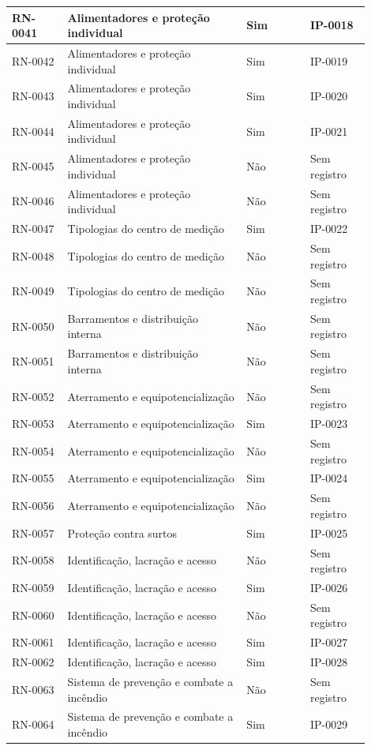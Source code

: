 \begin{longtable}{|p{0.14\linewidth}|p{0.45\linewidth}|p{0.16\linewidth}|p{0.15\linewidth}|}
RN-0041 & Alimentadores e proteção individual & Sim & IP-0018 \\\hline
RN-0042 & Alimentadores e proteção individual & Sim & IP-0019 \\\hline
RN-0043 & Alimentadores e proteção individual & Sim & IP-0020 \\\hline
RN-0044 & Alimentadores e proteção individual & Sim & IP-0021 \\\hline
RN-0045 & Alimentadores e proteção individual & Não & Sem registro \\\hline
RN-0046 & Alimentadores e proteção individual & Não & Sem registro \\\hline
RN-0047 & Tipologias do centro de medição & Sim & IP-0022 \\\hline
RN-0048 & Tipologias do centro de medição & Não & Sem registro \\\hline
RN-0049 & Tipologias do centro de medição & Não & Sem registro \\\hline
RN-0050 & Barramentos e distribuição interna & Não & Sem registro \\\hline
RN-0051 & Barramentos e distribuição interna & Não & Sem registro \\\hline
RN-0052 & Aterramento e equipotencialização & Não & Sem registro \\\hline
RN-0053 & Aterramento e equipotencialização & Sim & IP-0023 \\\hline
RN-0054 & Aterramento e equipotencialização & Não & Sem registro \\\hline
RN-0055 & Aterramento e equipotencialização & Sim & IP-0024 \\\hline
RN-0056 & Aterramento e equipotencialização & Não & Sem registro \\\hline
RN-0057 & Proteção contra surtos & Sim & IP-0025 \\\hline
RN-0058 & Identificação, lacração e acesso & Não & Sem registro \\\hline
RN-0059 & Identificação, lacração e acesso & Sim & IP-0026 \\\hline
RN-0060 & Identificação, lacração e acesso & Não & Sem registro \\\hline
RN-0061 & Identificação, lacração e acesso & Sim & IP-0027 \\\hline
RN-0062 & Identificação, lacração e acesso & Sim & IP-0028 \\\hline
RN-0063 & Sistema de prevenção e combate a incêndio & Não & Sem registro \\\hline
RN-0064 & Sistema de prevenção e combate a incêndio & Sim & IP-0029 \\\hline

\end{longtable}
